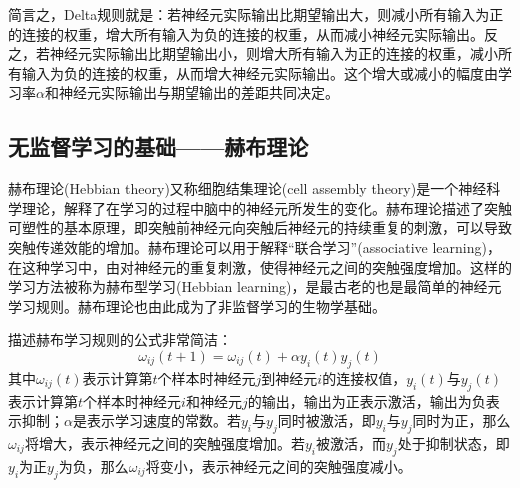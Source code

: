 \documentclass[a4paper]{ctexart}
\begin{document}
\begin{spacing}{1.3}
	简言之，Delta规则就是：若神经元实际输出比期望输出大，则减小所有输入为正的连接的权重，增大所有输入为负的连接的权重，从而减小神经元实际输出。反之，若神经元实际输出比期望输出小，则增大所有输入为正的连接的权重，减小所有输入为负的连接的权重，从而增大神经元实际输出。这个增大或减小的幅度由学习率$\alpha$和神经元实际输出与期望输出的差距共同决定。

	\subsection{无监督学习的基础——赫布理论}
	赫布理论(Hebbian theory)又称细胞结集理论(cell assembly theory)是一个神经科学理论，解释了在学习的过程中脑中的神经元所发生的变化。赫布理论描述了突触可塑性的基本原理，即突触前神经元向突触后神经元的持续重复的刺激，可以导致突触传递效能的增加\cite{RN124}。赫布理论可以用于解释“联合学习”(associative learning)，在这种学习中，由对神经元的重复刺激，使得神经元之间的突触强度增加。这样的学习方法被称为赫布型学习(Hebbian learning)，是最古老的也是最简单的神经元学习规则。赫布理论也由此成为了非监督学习的生物学基础。

	描述赫布学习规则的公式非常简洁：
	\begin{equation}
		\omega_{ij}(t+1)=\omega_{ij}(t)+\alpha y_i(t)y_j(t)
	\end{equation}
	其中$\omega_{ij}(t)$表示计算第$t$个样本时神经元$j$到神经元$i$的连接权值，$y_i(t)$与$y_j(t)$表示计算第$t$个样本时神经元$i$和神经元$j$的输出，输出为正表示激活，输出为负表示抑制；$\alpha$是表示学习速度的常数。若$y_i$与$y_j$同时被激活，即$y_i$与$y_j$同时为正，那么$\omega_{ij}$将增大，表示神经元之间的突触强度增加。若$y_i$被激活，而$y_j$处于抑制状态，即$y_i$为正$y_j$为负，那么$\omega_{ij}$将变小，表示神经元之间的突触强度减小。


\end{spacing}
\end{document}
